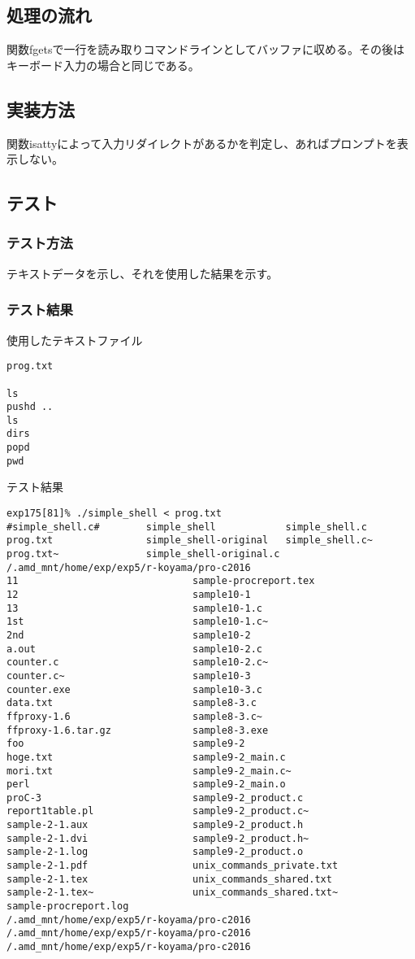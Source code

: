 \documentclass{procreport}
\begin{document}
\subsection{処理の流れ}
関数fgetsで一行を読み取りコマンドラインとしてバッファに収める。その後はキーボード入力の場合と同じである。
\subsection{実装方法}
関数isattyによって入力リダイレクトがあるかを判定し、あればプロンプトを表示しない。
\subsection{テスト}
\subsubsection{テスト方法}
テキストデータを示し、それを使用した結果を示す。
\subsubsection{テスト結果}
\label{sec:script}
使用したテキストファイル
\begin{screen}
\begin{verbatim}
prog.txt

ls
pushd ..
ls
dirs
popd
pwd
\end{verbatim}
\end{screen}
テスト結果
\begin{screen}
\begin{verbatim}
exp175[81]% ./simple_shell < prog.txt
#simple_shell.c#        simple_shell            simple_shell.c
prog.txt                simple_shell-original   simple_shell.c~
prog.txt~               simple_shell-original.c
/.amd_mnt/home/exp/exp5/r-koyama/pro-c2016
11                              sample-procreport.tex
12                              sample10-1
13                              sample10-1.c
1st                             sample10-1.c~
2nd                             sample10-2
a.out                           sample10-2.c
counter.c                       sample10-2.c~
counter.c~                      sample10-3
counter.exe                     sample10-3.c
data.txt                        sample8-3.c
ffproxy-1.6                     sample8-3.c~
ffproxy-1.6.tar.gz              sample8-3.exe
foo                             sample9-2
hoge.txt                        sample9-2_main.c
mori.txt                        sample9-2_main.c~
perl                            sample9-2_main.o
proC-3                          sample9-2_product.c
report1table.pl                 sample9-2_product.c~
sample-2-1.aux                  sample9-2_product.h
sample-2-1.dvi                  sample9-2_product.h~
sample-2-1.log                  sample9-2_product.o
sample-2-1.pdf                  unix_commands_private.txt
sample-2-1.tex                  unix_commands_shared.txt
sample-2-1.tex~                 unix_commands_shared.txt~
sample-procreport.log
/.amd_mnt/home/exp/exp5/r-koyama/pro-c2016
/.amd_mnt/home/exp/exp5/r-koyama/pro-c2016
/.amd_mnt/home/exp/exp5/r-koyama/pro-c2016
\end{verbatim}
\end{screen}
\end{document}
